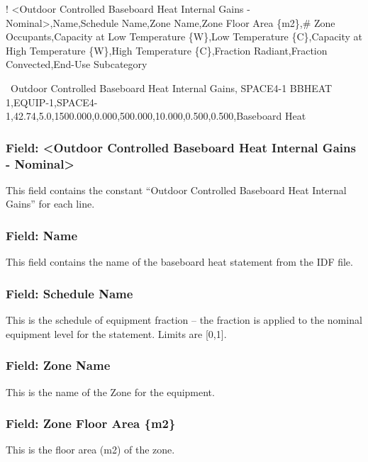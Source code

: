 ! \textless{}Outdoor Controlled Baseboard Heat Internal Gains - Nominal\textgreater{},Name,Schedule Name,Zone Name,Zone Floor Area \{m2\},\# Zone Occupants,Capacity at Low Temperature \{W\},Low Temperature \{C\},Capacity at High Temperature \{W\},High Temperature \{C\},Fraction Radiant,Fraction Convected,End-Use Subcategory

~Outdoor Controlled Baseboard Heat Internal Gains, SPACE4-1 BBHEAT 1,EQUIP-1,SPACE4-1,42.74,5.0,1500.000,0.000,500.000,10.000,0.500,0.500,Baseboard Heat

\subsubsection{Field: \textless{}Outdoor Controlled Baseboard Heat Internal Gains - Nominal\textgreater{}}\label{field-outdoor-controlled-baseboard-heat-internal-gains---nominal}

This field contains the constant ``Outdoor Controlled Baseboard Heat Internal Gains'' for each line.

\subsubsection{Field: Name}\label{field-name-5}

This field contains the name of the baseboard heat statement from the IDF file.

\subsubsection{Field: Schedule Name}\label{field-schedule-name-4}

This is the schedule of equipment fraction -- the fraction is applied to the nominal equipment level for the statement. Limits are {[}0,1{]}.

\subsubsection{Field: Zone Name}\label{field-zone-name-6}

This is the name of the Zone for the equipment.

\subsubsection{Field: Zone Floor Area \{m2\}}\label{field-zone-floor-area-m2-4}

This is the floor area (m2) of the zone.

